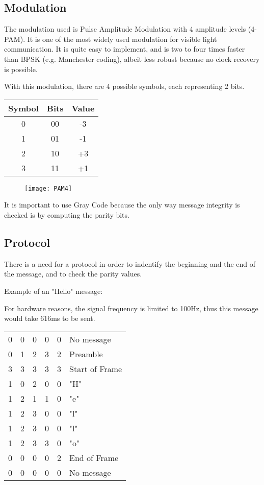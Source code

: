 \documentclass[12pt]{report}
\begin{document}
\subsection{Modulation}

The modulation used is Pulse Amplitude Modulation with 4 amplitude levels (4-PAM). It is one of the most widely used modulation for visible light communication. It is quite easy to implement, and is two to four times faster than BPSK (e.g. Manchester coding), albeit less robust because no clock recovery is possible.

With this modulation, there are 4 possible symbols, each representing 2 bits.

\begin{center}
\begin{tabular}{c|c|c}
Symbol&Bits&Value\\
\hline
0&00&-3\\
1&01&-1\\
2&10&+3\\
3&11&+1\\
\end{tabular}
\end{center}

\begin{figure}[h]
\centering
\texttt{[image: PAM4]}
\end{figure}

It is important to use Gray Code because the only way message integrity is checked is by computing the parity bits.

\subsection{Protocol}

There is a need for a protocol in order to indentify the beginning and the end of the message, and to check the parity values.

Example of an "Hello" message:


For hardware reasons, the signal frequency is limited to 100Hz, thus this message would take 616ms to be sent.

\begin{center}
\begin{tabular}{ccccc|l}
0&0&0&0&0&No message\\
0&1&2&3&2&Preamble\\
3&3&3&3&3&Start of Frame\\
1&0&2&0&0&"H"\\
1&2&1&1&0&"e"\\
1&2&3&0&0&"l"\\
1&2&3&0&0&"l"\\
1&2&3&3&0&"o"\\
0&0&0&0&2&End of Frame\\
0&0&0&0&0&No message\\
\end{tabular}
\end{center}
\end{document}

